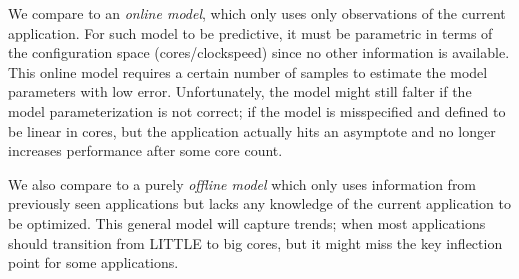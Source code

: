 


We compare \SYSTEM{} to an \emph{online model}, which only uses only
observations of the current application.  For such model to be
predictive, it must be parametric in terms of the configuration space
(cores/clockspeed) since no other information is available. This
online model requires a certain number of samples to estimate the
model parameters with low error.  Unfortunately, the model might still
falter if the model parameterization is not correct; \eg if the model
is misspecified and defined to be linear in cores, but the application
actually hits an asymptote and no longer increases performance after
some core count.

We also compare \SYSTEM{} to a purely \emph{offline model} which only
uses information from previously seen applications but lacks any
knowledge of the current application to be optimized. This general
model will capture trends; \eg when most applications should
transition from LITTLE to big cores, but it might miss the key
inflection point for some applications.


